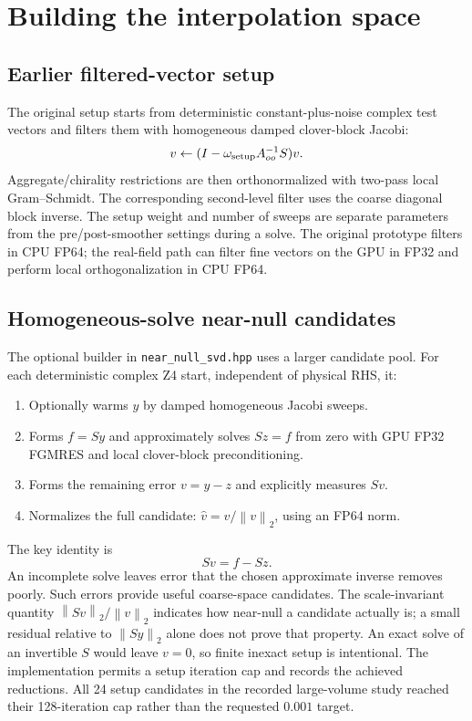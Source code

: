 \documentclass[11pt]{article}
\newcommand{\norm}[1]{\left\lVert#1\right\rVert_2}
\newcommand{\file}[1]{\nolinkurl{#1}}
\begin{document}
\section{Building the interpolation space}
\subsection{Earlier filtered-vector setup}
The original setup starts from deterministic constant-plus-noise complex
test vectors and filters them with homogeneous damped clover-block Jacobi:
\begin{equation}
 v\leftarrow (I-\omega_{\rm setup}A_{oo}^{-1}S)v.
\end{equation}
Aggregate/chirality restrictions are then orthonormalized with two-pass local
Gram--Schmidt. The corresponding second-level filter uses the coarse diagonal
block inverse. The setup weight and number of sweeps are separate parameters
from the pre/post-smoother settings during a solve. The original prototype
filters in CPU FP64; the real-field path can filter fine vectors on the GPU
in FP32 and perform local orthogonalization in CPU FP64.

\subsection{Homogeneous-solve near-null candidates}
The optional builder in \file{near_null_svd.hpp} uses a larger candidate pool.
For each deterministic complex Z4 start, independent of physical RHS, it:
\begin{enumerate}
 \item Optionally warms $y$ by damped homogeneous Jacobi sweeps.
 \item Forms $f=Sy$ and approximately solves $Sz=f$ from zero with GPU FP32
 FGMRES and local clover-block preconditioning.
 \item Forms the remaining error $v=y-z$ and explicitly measures $Sv$.
 \item Normalizes the full candidate: $\widehat v=v/\norm v$, using an FP64 norm.
\end{enumerate}
The key identity is
\begin{equation}
 Sv=f-Sz.
\end{equation}
An incomplete solve leaves error that the chosen approximate inverse removes
poorly. Such errors provide useful coarse-space candidates. The scale-invariant
quantity $\norm{Sv}/\norm v$ indicates how near-null a candidate actually is;
a small residual relative to $\norm{Sy}$ alone does not prove that property.
An exact solve of an invertible $S$ would leave $v=0$, so finite inexact setup
is intentional. The implementation permits a setup iteration cap and records
the achieved reductions. All 24 setup candidates in the recorded large-volume
study reached their 128-iteration cap rather than the requested $0.001$ target.
\end{document}
